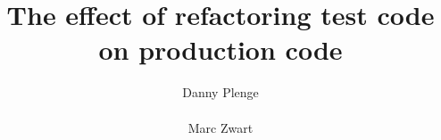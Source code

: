 \documentclass{sig-alternate}
\begin{document}
\title{The effect of refactoring test code on production code}

\author{
    \alignauthor
    Danny Plenge\\
    \\
    \alignauthor
    Marc Zwart\\
    \\
}

\maketitle













\end{document}
